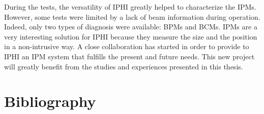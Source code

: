 During the tests, the versatility of IPHI greatly helped to characterize the IPMs. However, some tests were limited by a lack of beam information during operation. Indeed, only two types of diagnosis were available: BPMs and BCMs. IPMs are a very interesting solution for IPHI because they measure the size and  the position in a non-intrusive way. A close collaboration has started in order to provide to IPHI an IPM system that fulfills the present and future needs. This new project will greatly benefit from the studies and experiences presented in this thesis.

\cleardoublepage
\section*{Bibliography}
\label{ch2:bib}
\printbibliography[heading=subbibliography]




